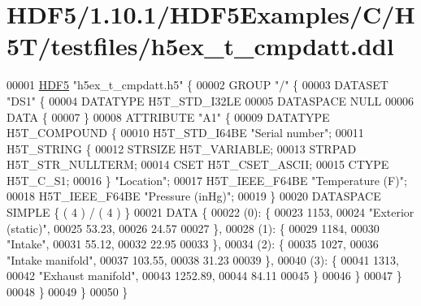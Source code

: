 \hypertarget{_h_d_f5_21_810_81_2_h_d_f5_examples_2_c_2_h5_t_2testfiles_2h5ex__t__cmpdatt_8ddl_source}{}\section{H\+D\+F5/1.10.1/\+H\+D\+F5\+Examples/\+C/\+H5\+T/testfiles/h5ex\+\_\+t\+\_\+cmpdatt.ddl}
\label{_h_d_f5_21_810_81_2_h_d_f5_examples_2_c_2_h5_t_2testfiles_2h5ex__t__cmpdatt_8ddl_source}

\begin{DoxyCode}
00001 \hyperlink{namespace_h_d_f5}{HDF5} \textcolor{stringliteral}{"h5ex\_t\_cmpdatt.h5"} \{
00002 GROUP \textcolor{stringliteral}{"/"} \{
00003    DATASET \textcolor{stringliteral}{"DS1"} \{
00004       DATATYPE  H5T\_STD\_I32LE
00005       DATASPACE  NULL
00006       DATA \{
00007       \}
00008       ATTRIBUTE \textcolor{stringliteral}{"A1"} \{
00009          DATATYPE  H5T\_COMPOUND \{
00010             H5T\_STD\_I64BE \textcolor{stringliteral}{"Serial number"};
00011             H5T\_STRING \{
00012                STRSIZE H5T\_VARIABLE;
00013                STRPAD H5T\_STR\_NULLTERM;
00014                CSET H5T\_CSET\_ASCII;
00015                CTYPE H5T\_C\_S1;
00016             \} \textcolor{stringliteral}{"Location"};
00017             H5T\_IEEE\_F64BE \textcolor{stringliteral}{"Temperature (F)"};
00018             H5T\_IEEE\_F64BE \textcolor{stringliteral}{"Pressure (inHg)"};
00019          \}
00020          DATASPACE  SIMPLE \{ ( 4 ) / ( 4 ) \}
00021          DATA \{
00022          (0): \{
00023                1153,
00024                \textcolor{stringliteral}{"Exterior (static)"},
00025                53.23,
00026                24.57
00027             \},
00028          (1): \{
00029                1184,
00030                \textcolor{stringliteral}{"Intake"},
00031                55.12,
00032                22.95
00033             \},
00034          (2): \{
00035                1027,
00036                \textcolor{stringliteral}{"Intake manifold"},
00037                103.55,
00038                31.23
00039             \},
00040          (3): \{
00041                1313,
00042                \textcolor{stringliteral}{"Exhaust manifold"},
00043                1252.89,
00044                84.11
00045             \}
00046          \}
00047       \}
00048    \}
00049 \}
00050 \}
\end{DoxyCode}
